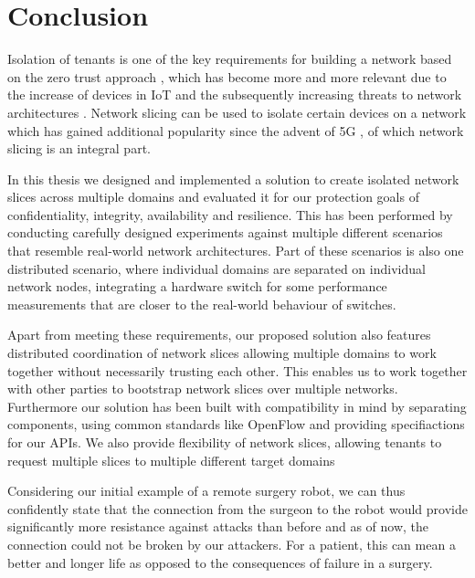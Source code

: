 \chapter{Conclusion}
\label{conclusion}
\iffalse
\begin{itemize}
    \item Summary
    \item Limitations
    \item Future work
\end{itemize}
\fi

Isolation of tenants is one of the key requirements for building a network based on the zero trust approach \cite{zerotrust}, which has become more and more relevant due to the increase of devices in IoT \cite{iotincrease} and the subsequently increasing threats to network architectures \cite{iotthreats}. Network slicing can be used to isolate certain devices on a network which has gained additional popularity since the advent of 5G \cite{5G1, 5G2, 5G3}, of which network slicing is an integral part.

In this thesis we designed and implemented a solution to create isolated network slices across multiple domains and evaluated it for our protection goals of confidentiality, integrity, availability and resilience. This has been performed by conducting carefully designed experiments against multiple different scenarios that resemble real-world network architectures. Part of these scenarios is also one distributed scenario, where individual domains are separated on individual network nodes, integrating a hardware switch for some performance measurements that are closer to the real-world behaviour of switches.

Apart from meeting these requirements, our proposed solution also features distributed coordination of network slices allowing multiple domains to work together without necessarily trusting each other. This enables us to work together with other parties to bootstrap network  slices over multiple networks. Furthermore our solution has been built with compatibility in mind by separating components, using common standards like OpenFlow and providing specifiactions for our APIs. We also provide flexibility of network slices, allowing tenants to request multiple slices to multiple different target domains

Considering our initial example of a remote surgery robot, we can thus confidently state that the connection from the surgeon to the robot would provide significantly more resistance against attacks than before and as of now, the connection could not be broken by our attackers. For a patient, this can mean a better and longer life as opposed to the consequences of failure in a surgery.

